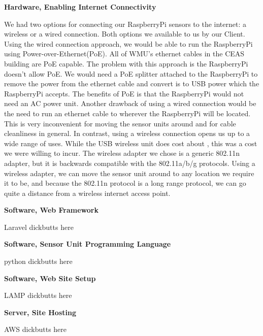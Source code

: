 \documentclass{report}
\begin{document}
\begin{center}
	\textbf{Hardware, Enabling Internet Connectivity}
\end{center}
\indent
We had two options for connecting our RaspberryPi sensors to the internet: a wireless or a wired connection. Both options we available to us by our Client.
\newline
\indent
Using the wired connection approach, we would be able to run the RaspberryPi using Power-over-Ethernet(PoE). All of WMU's ethernet cables in the CEAS building are PoE capable. The problem with this approach is the RaspberryPi doesn't allow PoE. We would need a PoE splitter attached to the RaspberryPi to remove the power from the ethernet cable and convert is to USB power which the RaspberryPi accepts. The benefits of PoE is that the RaspberryPi would not need an AC power unit.
\newline
\indent
Another drawback of using a wired connection would be the need to run an ethernet cable to wherever the RaspberryPi will be located. This is very inconvenient for moving the sensor units around and for cable cleanliness in general.
\newline
\indent
In contrast, using a wireless connection opens us up to a wide range of uses. While the USB wireless unit does cost about , this was a cost we were willing to incur. The wireless adapter we chose is a generic 802.11n adapter, but it is backwards compatible with the 802.11a/b/g protocols. Using a wireless adapter, we can move the sensor unit around to any location we require it to be, and because the 802.11n protocol is a long range protocol, we can go quite a distance from a wireless internet access point.
\newpage

\begin{center}
	\textbf{Software, Web Framework}
\end{center}
\indent
Laravel dickbutts here
\newpage

\begin{center}
	\textbf{Software, Sensor Unit Programming Language}
\end{center}
\indent
python dickbutts here
\newpage

\begin{center}
	\textbf{Software, Web Site Setup}
\end{center}
\indent
LAMP dickbutts here
\newpage

\begin{center}
	\textbf{Server, Site Hosting}
\end{center}
\indent
AWS dickbutts here
\newpage
\end{document}
